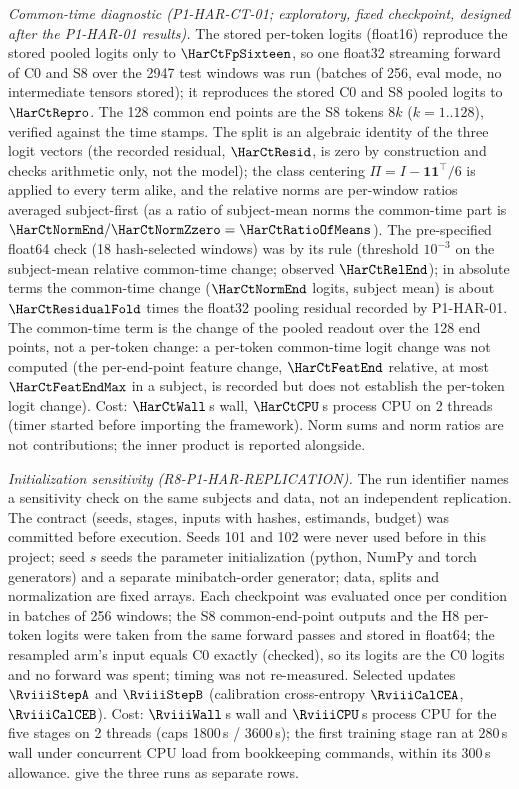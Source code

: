 \documentclass{article}
\theoremstyle{plain}
\theoremstyle{definition}
\theoremstyle{remark}
\begin{document}
\emph{Common-time diagnostic (P1-HAR-CT-01; exploratory, fixed checkpoint, designed after the P1-HAR-01 results).} The stored per-token logits (float16) reproduce the stored pooled logits only to $\HarCtFpSixteen$, so one float32 streaming forward of C0 and S8 over the 2947 test windows was run (batches of 256, eval mode, no intermediate tensors stored); it reproduces the stored C0 and S8 pooled logits to $\HarCtRepro$. The 128 common end points are the S8 tokens $8k$ ($k=1..128$), verified against the time stamps. The split is an algebraic identity of the three logit vectors (the recorded residual, $\HarCtResid$, is zero by construction and checks arithmetic only, not the model); the class centering $\Pi=I-\mathbf{1}\mathbf{1}^{\top}/6$ is applied to every term alike, and the relative norms are per-window ratios averaged subject-first (as a ratio of subject-mean norms the common-time part is $\HarCtNormEnd/\HarCtNormZzero=\HarCtRatioOfMeans$). The pre-specified float64 check (18 hash-selected windows) was \texttt{\HarCtFpSixtyFour} by its rule (threshold $10^{-3}$ on the subject-mean relative common-time change; observed $\HarCtRelEnd$); in absolute terms the common-time change ($\HarCtNormEnd$ logits, subject mean) is about $\HarCtResidualFold$ times the float32 pooling residual recorded by P1-HAR-01. The common-time term is the change of the pooled readout over the 128 end points, not a per-token change: a per-token common-time logit change was not computed (the per-end-point feature change, $\HarCtFeatEnd$ relative, at most $\HarCtFeatEndMax$ in a subject, is recorded but does not establish the per-token logit change). Cost: $\HarCtWall$\,s wall, $\HarCtCPU$\,s process CPU on 2 threads (timer started before importing the framework). Norm sums and norm ratios are not contributions; the inner product is reported alongside.



\emph{Initialization sensitivity (R8-P1-HAR-REPLICATION).} The run identifier names a sensitivity check on the same subjects and data, not an independent replication. The contract (seeds, stages, inputs with hashes, estimands, budget) was committed before execution. Seeds 101 and 102 were never used before in this project; seed $s$ seeds the parameter initialization (python, NumPy and torch generators) and a separate minibatch-order generator; data, splits and normalization are fixed arrays. Each checkpoint was evaluated once per condition in batches of 256 windows; the S8 common-end-point outputs and the H8 per-token logits were taken from the same forward passes and stored in float64; the resampled arm's input equals C0 exactly (checked), so its logits are the C0 logits and no forward was spent; timing was not re-measured. Selected updates $\RviiiStepA$ and $\RviiiStepB$ (calibration cross-entropy $\RviiiCalCEA$, $\RviiiCalCEB$). Cost: $\RviiiWall$\,s wall and $\RviiiCPU$\,s process CPU for the five stages on 2 threads (caps 1800\,s / 3600\,s); the first training stage ran at $280$\,s wall under concurrent CPU load from bookkeeping commands, within its 300\,s allowance.  give the three runs as separate rows.
\end{document}
